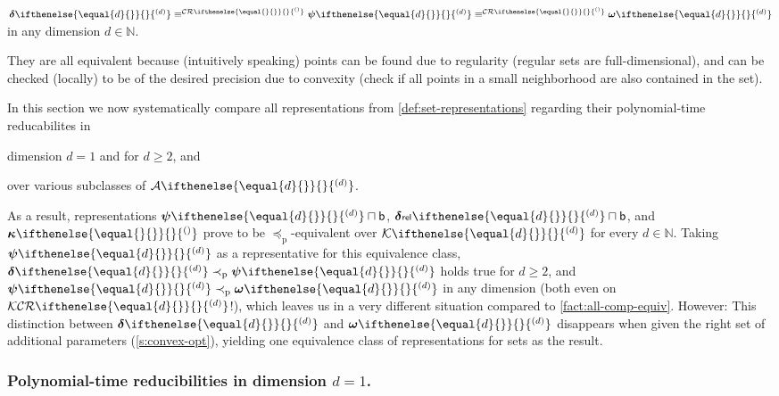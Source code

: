 \documentclass{CSML}
\newcommand{\setTypes}[2]{ \mathcal{#1}\ifnotempty{#2}{^{(#2)}} }
\newcommand{\representation}[2]{ #1\ifnotempty{#2}{^{(#2)}} }
\newcommand{\IN}{\mathbb{N}}
\newcommand{\distrep}[1][\empty]{ \representation{\bm{\delta}}{#1} }
\newcommand{\reldistrep}[1][\empty]{ \representation{%
	\bm{\delta}\kern.05ex{\scriptstyle\mathsf{rel}}\kern.1ex%
	}{#1} }
\newcommand{\setrep}[1][\empty]{ \representation{\bm{\psi}}{#1} }
\newcommand{\gridrep}[1][\empty]{ \representation{\bm{\kappa}}{#1} }
\newcommand{\wmemrep}[1][\empty]{ \representation{\bm{\omega}}{#1} }
\newcommand{\clset}[1][\empty]{ \representation{\mathcal{A}}{#1} }
\newcommand{\compset}[1][\empty]{ \representation{\mathcal{K}}{#1} }
\newcommand{\ifnotempty}[2]{ \ifthenelse{ \equal{#1}{\empty} }{}{#2} }
\newcommand{\CR}[1][\empty]{\setTypes{CR}{#1}}
\newcommand{\KCR}[1][\empty]{\setTypes{KCR}{#1}}
\newcommand{\cb}{\CR}   %
\newcommand{\pleq}{\preceq_\mathrm{p}}
\newcommand{\pless}{\prec_\mathrm{p}}
\newcommand{\enp}[1]{\sqcap \mathsf{#1}}
\begin{document}
\begin{fact}        \label{fact:all-comp-equiv}
$\distrep[d] \equiv^{\cb} \setrep[d] \equiv^{\cb} \wmemrep[d]$
in any dimension $d \in \IN$.
\end{fact}
%
They are all equivalent because (intuitively speaking) points can be found
due to regularity (regular sets are full-dimensional), and can be checked
(locally) to be of the desired precision due to convexity
(check if all points in a small neighborhood are also contained in the set).

In this section we now systematically compare all representations from
\cref{def:set-representations} regarding their polynomial-time reducabilites
in
\begin{enumerate*}[label=(\emph{\alph*})]
\item dimension $d=1$ and for $d \geq 2$, and
\item over various subclasses of $\clset[d]$.
\end{enumerate*}
As a result, representations $\setrep[d] \enp{b}$, $\reldistrep[d] \enp{b}$,
and $\gridrep$ prove to be $\pleq$-equivalent over $\compset[d]$ for every
$d \in \IN$.
Taking $\setrep[d]$ as a representative for this equivalence class,
$\distrep[d] \pless \setrep[d]$ holds true for $d \geq 2$,
and $\setrep[d] \pless \wmemrep[d]$ in any dimension (both even on
$\KCR[d]$!), which leaves us in a very different situation compared to
\cref{fact:all-comp-equiv}.
However: This distinction between $\distrep[d]$ and $\wmemrep[d]$ disappears
when given the right set of additional parameters (\cref{s:convex-opt}),
yielding one equivalence class of representations for sets as the result.




\subsubsection{Polynomial-time reducibilities in dimension $d=1$.}


\end{document}
